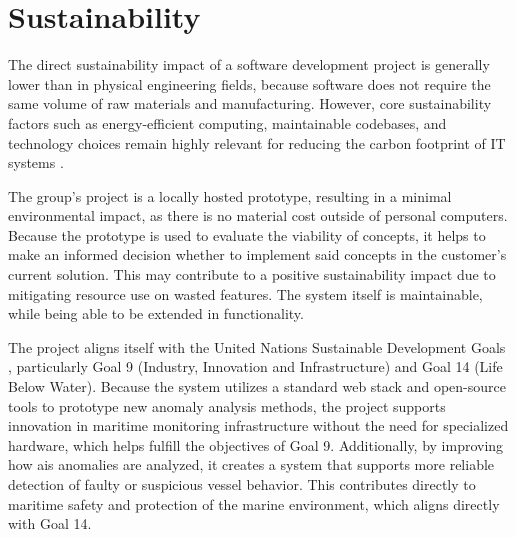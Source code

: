 \section{Sustainability}

The direct sustainability impact of a software development project is generally lower than in physical engineering fields, because software does not require the same volume of raw materials and manufacturing. However, core sustainability factors such as energy-efficient computing, maintainable codebases, and technology choices remain highly relevant for reducing the carbon footprint of IT systems \parencite{becker2015sustainability}.

The group's project is a locally hosted prototype, resulting in a minimal environmental impact, as there is no material cost outside of personal computers. Because the prototype is used to evaluate the viability of concepts, it helps to make an informed decision whether to implement said concepts in the customer's current solution. This may contribute to a positive sustainability impact due to mitigating resource use on wasted features. The system itself is maintainable, while being able to be extended in functionality.

The project aligns itself with the United Nations Sustainable Development Goals \parencite{un_sdg}, particularly Goal 9 (Industry, Innovation and Infrastructure) and Goal 14 (Life Below Water). Because the system utilizes a standard web stack and open-source tools to prototype new anomaly analysis methods, the project supports innovation in maritime monitoring infrastructure without the need for specialized hardware, which helps fulfill the objectives of Goal 9. Additionally, by improving how \acrshort{ais} anomalies are analyzed, it creates a system that supports more reliable detection of faulty or suspicious vessel behavior. This contributes directly to maritime safety and protection of the marine environment, which aligns directly with Goal 14.

